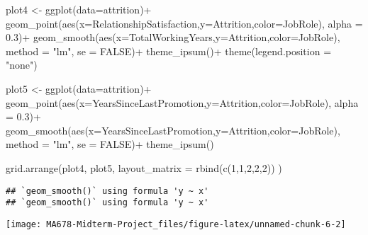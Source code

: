 \documentclass[
]{article}
\newenvironment{Shaded}{\begin{snugshade}}{\end{snugshade}}
\newcommand{\AttributeTok}[1]{\textcolor[rgb]{0.77,0.63,0.00}{#1}}
\newcommand{\ConstantTok}[1]{\textcolor[rgb]{0.00,0.00,0.00}{#1}}
\newcommand{\DecValTok}[1]{\textcolor[rgb]{0.00,0.00,0.81}{#1}}
\newcommand{\FloatTok}[1]{\textcolor[rgb]{0.00,0.00,0.81}{#1}}
\newcommand{\FunctionTok}[1]{\textcolor[rgb]{0.00,0.00,0.00}{#1}}
\newcommand{\NormalTok}[1]{#1}
\newcommand{\OtherTok}[1]{\textcolor[rgb]{0.56,0.35,0.01}{#1}}
\newcommand{\SpecialCharTok}[1]{\textcolor[rgb]{0.00,0.00,0.00}{#1}}
\newcommand{\StringTok}[1]{\textcolor[rgb]{0.31,0.60,0.02}{#1}}
\begin{document}
\begin{Shaded}
\begin{Highlighting}[]
\NormalTok{plot4 }\OtherTok{\textless{}{-}} \FunctionTok{ggplot}\NormalTok{(}\AttributeTok{data=}\NormalTok{attrition)}\SpecialCharTok{+}
  \FunctionTok{geom\_point}\NormalTok{(}\FunctionTok{aes}\NormalTok{(}\AttributeTok{x=}\NormalTok{RelationshipSatisfaction,}\AttributeTok{y=}\NormalTok{Attrition,}\AttributeTok{color=}\NormalTok{JobRole), }\AttributeTok{alpha =} \FloatTok{0.3}\NormalTok{)}\SpecialCharTok{+}
  \FunctionTok{geom\_smooth}\NormalTok{(}\FunctionTok{aes}\NormalTok{(}\AttributeTok{x=}\NormalTok{TotalWorkingYears,}\AttributeTok{y=}\NormalTok{Attrition,}\AttributeTok{color=}\NormalTok{JobRole), }\AttributeTok{method =} \StringTok{"lm"}\NormalTok{, }\AttributeTok{se =} \ConstantTok{FALSE}\NormalTok{)}\SpecialCharTok{+}
  \FunctionTok{theme\_ipsum}\NormalTok{()}\SpecialCharTok{+}
  \FunctionTok{theme}\NormalTok{(}\AttributeTok{legend.position =} \StringTok{"none"}\NormalTok{)}

\NormalTok{plot5 }\OtherTok{\textless{}{-}} \FunctionTok{ggplot}\NormalTok{(}\AttributeTok{data=}\NormalTok{attrition)}\SpecialCharTok{+}
  \FunctionTok{geom\_point}\NormalTok{(}\FunctionTok{aes}\NormalTok{(}\AttributeTok{x=}\NormalTok{YearsSinceLastPromotion,}\AttributeTok{y=}\NormalTok{Attrition,}\AttributeTok{color=}\NormalTok{JobRole), }\AttributeTok{alpha =} \FloatTok{0.3}\NormalTok{)}\SpecialCharTok{+}
  \FunctionTok{geom\_smooth}\NormalTok{(}\FunctionTok{aes}\NormalTok{(}\AttributeTok{x=}\NormalTok{YearsSinceLastPromotion,}\AttributeTok{y=}\NormalTok{Attrition,}\AttributeTok{color=}\NormalTok{JobRole), }\AttributeTok{method =} \StringTok{"lm"}\NormalTok{, }\AttributeTok{se =} \ConstantTok{FALSE}\NormalTok{)}\SpecialCharTok{+}
  \FunctionTok{theme\_ipsum}\NormalTok{()}

\FunctionTok{grid.arrange}\NormalTok{(plot4, plot5,}
             \AttributeTok{layout\_matrix =} \FunctionTok{rbind}\NormalTok{(}\FunctionTok{c}\NormalTok{(}\DecValTok{1}\NormalTok{,}\DecValTok{1}\NormalTok{,}\DecValTok{2}\NormalTok{,}\DecValTok{2}\NormalTok{,}\DecValTok{2}\NormalTok{))}
\NormalTok{             )}
\end{Highlighting}
\end{Shaded}

\begin{verbatim}
## `geom_smooth()` using formula 'y ~ x'
## `geom_smooth()` using formula 'y ~ x'
\end{verbatim}

\begin{center}\texttt{[image: MA678-Midterm-Project\_files/figure-latex/unnamed-chunk-6-2]} \end{center}
\end{document}
